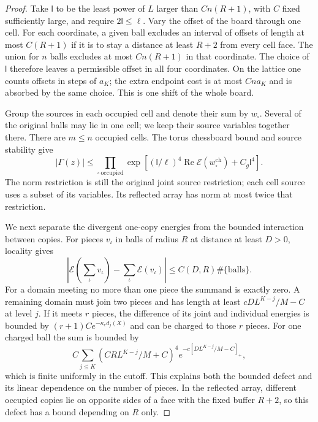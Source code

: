 \documentclass[11pt,letterpaper,reqno]{amsart}
\theoremstyle{definition}
\theoremstyle{remark}
\begin{document}
\begin{proof}
Take $\mathsf l$ to be the least power of $L$ larger than
$C n(R+1)$, with $C$ fixed sufficiently large, and require
$2\mathsf l\le\ell$. Vary the offset of the board through one
cell. For each coordinate, a given ball excludes an interval of
offsets of length at most $C(R+1)$ if it is to stay a distance at
least $R+2$ from every cell face. The union for $n$ balls excludes
at most $Cn(R+1)$ in that coordinate. The choice of $\mathsf l$
therefore leaves a permissible offset in all four coordinates.
On the lattice one counts offsets in steps of $a_K$; the extra endpoint
cost is at most $Cna_K$ and is absorbed by the same choice. This is
one shift of the whole board.

Group the sources in each occupied cell and denote their sum by
$w_\square$. Several of the original balls may lie in one cell;
we keep their source variables together there. There are $m\le n$
occupied cells. The torus chessboard bound and source stability give
\begin{equation}\label{eq:per-ball-cell-product}
 |\Gamma(z)|
   \le\prod_{\square\ \mathrm{occupied}}
       \exp\left[(\mathsf l/\ell)^4
                   \operatorname{Re}\mathcal E(w_\square^{\mathrm{ch}})
                      +C_g\mathsf l^4\right].
\end{equation}
The norm restriction is still the original joint source restriction;
each cell source uses a subset of its variables. Its reflected array
has norm at most twice that restriction.

We next separate the divergent one-copy energies from the bounded
interaction between copies. For pieces $v_\iota$ in balls of radius
$R$ at distance at least $D>0$, locality gives
\[
 \left|\mathcal E\left(\sum_\iota v_\iota\right)
                         -\sum_\iota\mathcal E(v_\iota)\right|
            \le C(D,R)\#\{\text{balls}\}.
\]
For a domain meeting no more than one piece the summand is exactly
zero. A remaining domain must join two pieces and has length at
least $cD L^{K-j}/M-C$ at level $j$. If it meets $r$ pieces,
the difference of its joint and individual energies is bounded by
$(r+1)Ce^{-\kappa_ed_j(X)}$ and can be charged to those $r$
pieces. For one charged ball the sum is bounded by
\[
 C\sum_{j\le K}(CRL^{K-j}/M+C)^4
                 e^{-c[DL^{K-j}/M-C]_+},
\]
which is finite uniformly in the cutoff. This explains both the
bounded defect and its linear dependence on the number of pieces.
In the reflected array, different occupied copies lie on opposite
sides of a face with the fixed buffer $R+2$, so this defect has
a bound depending on $R$ only.


\end{proof}
\end{document}
